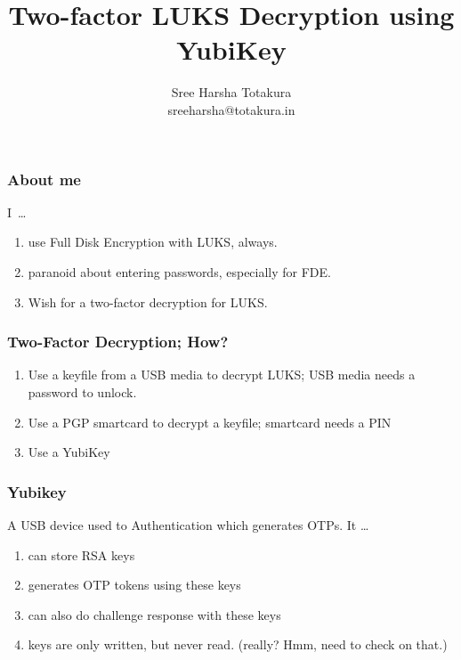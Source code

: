 \documentclass{beamer}
\title{Two-factor LUKS Decryption using YubiKey}
\author{Sree Harsha Totakura \\ {\footnotesize sreeharsha@totakura.in}}
\begin{document}
\begin{frame}
  \maketitle
\end{frame}

\begin{frame}
  \frametitle{About me}
  I~\ldots{}
  \begin{enumerate}
  \item use Full Disk Encryption with LUKS, always.
  \item paranoid about entering passwords, especially for FDE.
  \item Wish for a two-factor decryption for LUKS.
  \end{enumerate}
\end{frame}

\begin{frame}
  \frametitle{Two-Factor Decryption; How?}
  \begin{enumerate}
  \item Use a keyfile from a USB media to decrypt LUKS; USB media needs a
    password to unlock.
  \item Use a PGP smartcard to decrypt a keyfile; smartcard needs a PIN
  \item Use a \alert{YubiKey}
  \end{enumerate}
\end{frame}

\begin{frame}
  \frametitle{Yubikey}
  A USB device used to Authentication which generates OTPs. It \ldots{}
  \begin{enumerate}
  \item can store RSA keys
  \item generates OTP tokens using these keys
  \item can also do challenge response with these keys
  \item keys are only written, but never read. (really? Hmm, need to check on
    that.)
  \end{enumerate}
\end{frame}
\end{document}
